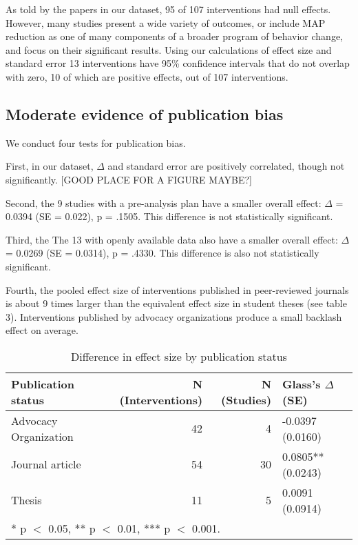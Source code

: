\documentclass[sn-nature,pdflatex]{sn-jnl}
\begin{document}
As told by the papers in our dataset, 95 of 107 interventions had null
effects. However, many studies present a wide variety of outcomes, or
include MAP reduction as one of many components of a broader program of
behavior change, and focus on their significant results. Using our
calculations of effect size and standard error 13 interventions have
95\% confidence intervals that do not overlap with zero, 10 of which are
positive effects, out of 107 interventions.

\subsection{Moderate evidence of publication bias}\label{sec2.3}

We conduct four tests for publication bias.

First, in our dataset, \(\Delta\) and standard error are positively
correlated, though not significantly. {[}GOOD PLACE FOR A FIGURE
MAYBE?{]}

Second, the 9 studies with a pre-analysis plan have a smaller overall
effect: \(\Delta\) = 0.0394 (SE = 0.022), p = .1505. This difference is
not statistically significant.

Third, the The 13 with openly available data also have a smaller overall
effect: \(\Delta\) = 0.0269 (SE = 0.0314), p = .4330. This difference is
also not statistically significant.

Fourth, the pooled effect size of interventions published in
peer-reviewed journals is about 9 times larger than the equivalent
effect size in student theses (see table 3). Interventions published by
advocacy organizations produce a small backlash effect on average.

\begin{table}[!h]
\centering
\caption{\label{tab:tab:table_two}Difference in effect size by publication status}
\centering
\begin{tabular}[t]{lrrl}
\toprule
Publication status & N (Interventions) & N (Studies) & Glass's $\Delta$ (SE)\\
\midrule
Advocacy Organization & 42 & 4 & -0.0397 (0.0160)\\
Journal article & 54 & 30 & 0.0805** (0.0243)\\
Thesis & 11 & 5 & 0.0091 (0.0914)\\
\bottomrule
\multicolumn{4}{l}{\rule{0pt}{1em}* p $<$ 0.05, ** p $<$ 0.01, *** p $<$ 0.001.}\\
\end{tabular}
\end{table}
\end{document}

